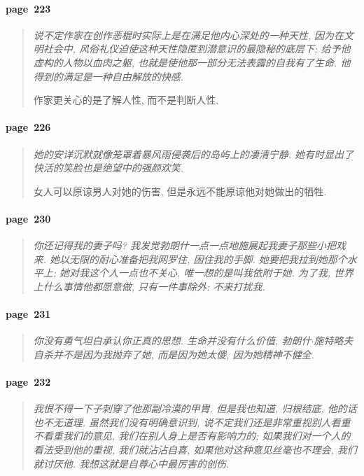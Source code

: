 \paragraph*{page~223}
\begin{quotation}
    \itshape
    说不定作家在创作恶棍时实际上是在满足他内心深处的一种天性, 因为在文明社会中, 风俗礼仪迫使这种天性隐匿到潜意识的最隐秘的底层下; 给予他虚构的人物以血肉之躯, 也就是使他那一部分无法表露的自我有了生命. 他得到的满足是一种自由解放的快感.

    作家更关心的是了解人性, 而不是判断人性. 
\end{quotation}


\paragraph*{page~226}
\begin{quotation}
    \itshape
    她的安详沉默就像笼罩着暴风雨侵袭后的岛屿上的凄清宁静. 她有时显出了快活的笑脸也是绝望中的强颜欢笑. 

    女人可以原谅男人对她的伤害, 但是永远不能原谅他对她做出的牺牲. 
\end{quotation}

\paragraph*{page~230}
\begin{quotation}
    \itshape
    你还记得我的妻子吗? 我发觉勃朗什一点一点地施展起我妻子那些小把戏来. 她以无限的耐心准备把我网罗住, 困住我的手脚. 她要把我拉到她那个水平上; 她对我这个人一点也不关心, 唯一想的是叫我依附于她. 为了我, 世界上什么事情他都愿意做, 只有一件事除外: 不来打扰我.
\end{quotation}

\paragraph*{page~231}
\begin{quotation}
    \itshape
    你没有勇气坦白承认你正真的思想. 生命并没有什么价值, 勃朗什$\cdot$施特略夫自杀并不是因为我抛弃了她, 而是因为她太傻, 因为她精神不健全. 
\end{quotation}

\paragraph*{page~232}
\begin{quotation}
    \itshape
    我恨不得一下子刺穿了他那副冷漠的甲胄. 但是我也知道, 归根结底, 他的话也不无道理. 虽然我们没有明确意识到, 说不定我们还是非常重视别人看重不看重我们的意见, 我们在别人身上是否有影响力的; 如果我们对一个人的看法受到他的重视, 我们就沾沾自喜, 如果他对这种意见丝毫也不理会, 我们就讨厌他. 我想这就是自尊心中最厉害的创伤. 
\end{quotation}

